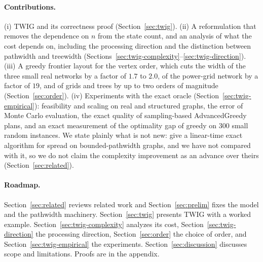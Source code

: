\documentclass[11pt]{article}
\theoremstyle{definition}
\theoremstyle{remark}
\begin{document}
\paragraph{Contributions.} (i) TWIG and its correctness proof (Section~\ref{sec:twig}). (ii) A reformulation that removes the dependence on $n$ from the state count, and an analysis of what the cost depends on, including the processing direction and the distinction between pathwidth and treewidth (Sections~\ref{sec:twig-complexity}--\ref{sec:twig-direction}). (iii) A greedy frontier layout for the vertex order, which cuts the width of the three small real networks by a factor of $1.7$ to $2.0$, of the power-grid network by a factor of $19$, and of grids and trees by up to two orders of magnitude (Section~\ref{sec:order}). (iv) Experiments with the exact oracle (Section~\ref{sec:twig-empirical}): feasibility and scaling on real and structured graphs, the error of Monte Carlo evaluation, the exact quality of sampling-based AdvancedGreedy plans, and an exact measurement of the optimality gap of greedy on 300 small random instances. We state plainly what is not new: \citet{nakamura2026} give a linear-time exact algorithm for spread on bounded-pathwidth graphs, and we have not compared with it, so we do not claim the complexity improvement as an advance over theirs (Section~\ref{sec:related}).

\paragraph{Roadmap.} Section~\ref{sec:related} reviews related work and Section~\ref{sec:prelim} fixes the model and the pathwidth machinery. Section~\ref{sec:twig} presents TWIG with a worked example. Section~\ref{sec:twig-complexity} analyzes its cost, Section~\ref{sec:twig-direction} the processing direction, Section~\ref{sec:order} the choice of order, and Section~\ref{sec:twig-empirical} the experiments. Section~\ref{sec:discussion} discusses scope and limitations. Proofs are in the appendix.
\end{document}
